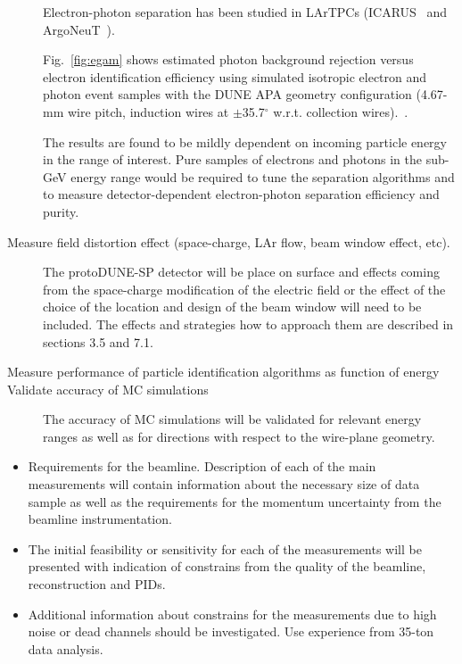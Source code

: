 \begin{description}
Electron-photon separation has been studied in LArTPCs (ICARUS~\cite{icarus_eg} and ArgoNeuT~\cite{argoneut_eg}).

Fig.~\ref{fig:egam}  shows estimated photon background rejection versus electron identification efficiency using 
simulated isotropic electron and photon event samples  with the DUNE APA geometry configuration (4.67-mm wire pitch, induction wires at $\pm$35.7$^{\circ}$ w.r.t. collection wires).~\cite{dunecdr}. 

The results are found to be mildly dependent on incoming particle energy in the range of interest. 
Pure samples of electrons and photons in the sub-GeV energy range would be
required to tune the separation algorithms and to measure 
detector-dependent electron-photon separation efficiency and purity. 


\item [Measure field distortion effect (space-charge, LAr flow, beam window effect, etc).] 

The protoDUNE-SP detector will be place on surface and effects coming from the space-charge modification of the electric field or the effect of the choice of the location and design of the beam window will need to be included. The effects and strategies how to approach them are described in sections 3.5 and 7.1.

\item [Measure performance of particle identification algorithms as function of energy]

\item [Validate accuracy of MC simulations] The accuracy of MC simulations will be validated for relevant energy ranges as well as for 
directions with respect to the wire-plane geometry.
\end{description}

\begin{itemize}
\item Requirements for the beamline. Description of  each of the main measurements will contain  information about the necessary size of data sample as well as the requirements  for the momentum uncertainty from the beamline instrumentation. 
\item The initial feasibility or sensitivity  for each of the measurements will be presented with indication of constrains from the quality of the beamline, reconstruction and PIDs. 
\item Additional information about constrains for the measurements due to high noise or dead channels should be investigated. Use experience from 35-ton data analysis. 
\end{itemize}

